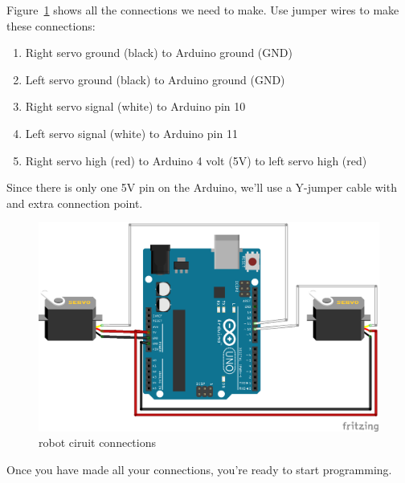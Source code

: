 \documentclass[letterpaper]{article}
\begin{document}
Figure~\ref{fig:circuit} shows all the connections we need to make.
Use jumper wires to make these connections:
\begin{enumerate}
    \item Right servo ground (black) to Arduino ground (GND)
    \item Left servo ground (black) to Arduino ground (GND)
    \item Right servo signal (white) to Arduino pin 10
    \item Left servo signal (white) to Arduino pin 11
    \item Right servo high (red) to Arduino 4 volt (5V) to left servo high (red)
\end{enumerate}
Since there is only one 5V pin on the Arduino,
we'll use a Y-jumper cable with and extra connection point.

\begin{figure}[h!]
    \centering
    \includegraphics[width=\textwidth]{wiring.png}
    \caption{robot ciruit connections}
    \label{fig:circuit}
\end{figure}

Once you have made all your connections, you're ready to start programming.


\clearpage


\end{document}
